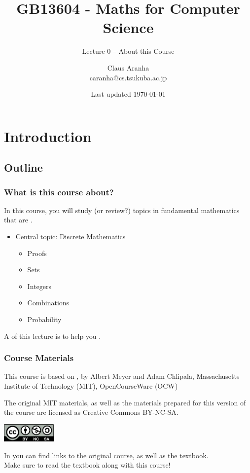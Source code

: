 \documentclass[aspectratio=169]{beamer}
\title[GB13604]{GB13604 - Maths for Computer Science}
\subtitle[]{Lecture 0 -- About this Course}
\author[Claus Aranha]{Claus Aranha\\{\footnotesize caranha@cs.tsukuba.ac.jp}}
\institute[COINS]{College of Information Science}
\date[]{{\tiny Last updated \today}}
\begin{document}
\section{Introduction}
\subsection{Outline}

\begin{frame}
  \maketitle
\end{frame}

\begin{frame}
  \frametitle{What is this course about?}

  In this course, you will study (or review?) topics in fundamental mathematics that are .

  \vfill

  \begin{itemize}
  \item Central topic: Discrete Mathematics
    \begin{itemize}
    \item Proofs
    \item Sets
    \item Integers
    \item Combinations
    \item Probability
    \end{itemize}
  \end{itemize}


  \bigskip

  A  of this lecture is to help you .
\end{frame}


\begin{frame}
  \frametitle{Course Materials}


  This course is based on , by Albert Meyer and Adam Chlipala, Massachusetts Institute of Technology (MIT), OpenCourseWare (OCW)

  \bigskip

  The original MIT materials, as well as the materials prepared for this   version of the course are licensed as Creative Commons BY-NC-SA.

  \bigskip

  \begin{center}
    \includegraphics[width=0.2\textwidth]{../img/by-nc-sa}
  \end{center}

  \bigskip

  In  you can find links to the original course, as well as the textbook.\\
  \alert{Make sure to read the textbook along with this course!}
\end{frame}
\end{document}
